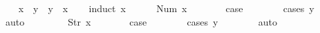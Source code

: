 \begin{isabellebody}
\ \ \isamarkupfalse%
\ {\isachardoublequoteopen}x\ {\isasymle}\ y\ {\isasymor}\ y\ {\isasymle}\ x{\isachardoublequoteclose}\isanewline
\ \ \isamarkupfalse%
\ {\isacharparenleft}induct\ x{\isacharparenright}\isanewline
\ \ \ \ \isamarkupfalse%
\ {\isacharparenleft}Num\ x{\isacharparenright}\isanewline
\ \ \ \ \isamarkupfalse%
\ \isamarkupfalse%
\ {\isacharquery}case\isanewline
\ \ \ \ \ \ \isamarkupfalse%
\ {\isacharparenleft}cases\ y{\isacharparenright}\isanewline
\ \ \ \ \ \ \isamarkupfalse%
\ auto\isanewline
\ \ \isamarkupfalse%
\isanewline
\ \ \ \ \isamarkupfalse%
\ {\isacharparenleft}Str\ x{\isacharparenright}\isanewline
\ \ \ \ \isamarkupfalse%
\ \isamarkupfalse%
\ {\isacharquery}case\isanewline
\ \ \ \ \ \ \isamarkupfalse%
\ {\isacharparenleft}cases\ y{\isacharparenright}\isanewline
\ \ \ \ \ \ \isamarkupfalse%
\ auto\isanewline
\ \ \isamarkupfalse%
\isanewline
{}\isamarkupfalse%
%
\endisatagproof
{\isafoldproof}%
%
\isadelimproof
%
\endisadelimproof
\isanewline
{}\isamarkupfalse%
\isanewline
%
\isadelimtheory
\isanewline
%
\endisadelimtheory
%
\isatagtheory
{}\isamarkupfalse%
%
\endisatagtheory
{\isafoldtheory}%
%
\isadelimtheory
%
\endisadelimtheory
%
\end{isabellebody}%
\endinput
